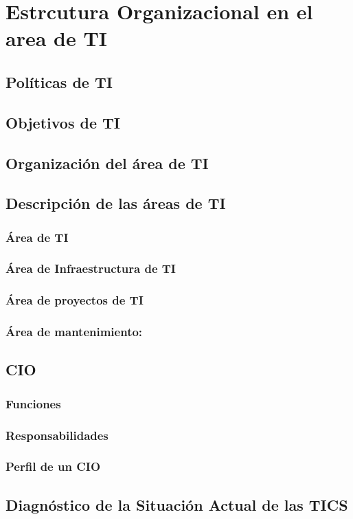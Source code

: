 \section{Estrcutura Organizacional en el area de TI}

\subsection{Políticas de TI}
\subsection{Objetivos de TI}
\subsection{Organización del área de TI}
\subsection{Descripción de las áreas de TI}
\subsubsection{Área de TI}
\subsubsection{Área de Infraestructura de TI}
\subsubsection{Área de proyectos de TI}
\subsubsection{Área de mantenimiento: }
\subsection{CIO}
\subsubsection{Funciones}
\subsubsection{Responsabilidades }
\subsubsection{Perfil de un CIO}
\subsection{Diagnóstico de la Situación Actual de las TICS}
